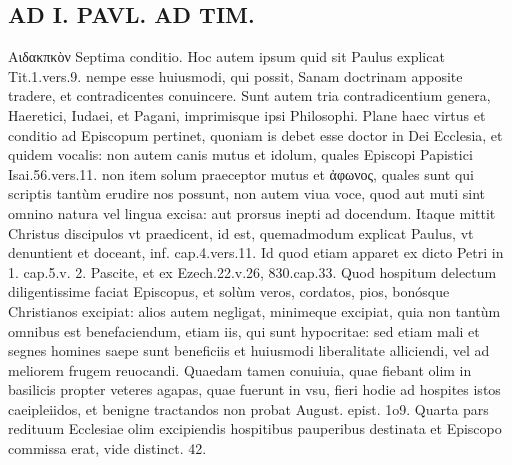\documentclass{article}
\begin{document}
\begin{pages}
\section*{AD I. PAVL. AD TIM. }
\marginpar{[ p.126 ]}\pstart Αιδακπκὸν Septima conditio. Hoc autem ipsum quid sit Paulus explicat Tit.1.vers.9. nempe esse huiusmodi, qui possit, Sanam doctrinam apposite tradere, et contradicentes conuincere. Sunt autem tria contradicentium genera, Haeretici, Iudaei, et Pagani, imprimisque ipsi Philosophi. Plane haec virtus et conditio ad Episcopum pertinet, quoniam is debet esse doctor in Dei Ecclesia, et quidem vocalis: non autem canis mutus et idolum, quales Episcopi Papistici Isai.56.vers.11. non item solum praeceptor mutus et ἀφωνος, quales sunt qui scriptis tantùm erudire nos possunt, non autem viua voce, quod aut muti sint omnino natura vel lingua excisa: aut prorsus inepti ad docendum. Itaque mittit Christus discipulos vt praedicent, id est, quemadmodum explicat Paulus, vt denuntient et doceant, inf. cap.4.vers.11. Id quod etiam apparet ex dicto Petri in 1. cap.5.v. 2. Pascite, et ex Ezech.22.v.26, 830.cap.33. Quod  \pend\pstart hospitum delectum diligentissime faciat Episcopus, et solùm veros, cordatos, pios, bonósque Christianos excipiat: alios autem negligat, minimeque  excipiat, quia non tantùm omnibus est benefaciendum, etiam iis, qui sunt hypocritae: sed etiam mali et segnes homines saepe sunt beneficiis et huiusmodi liberalitate alliciendi, vel ad meliorem frugem reuocandi. Quaedam tamen conuiuia, quae fiebant olim in basilicis propter veteres agapas, quae fuerunt in vsu, fieri hodie ad hospites istos caeipleiidos, et benigne tractandos non probat August. epist. 1o9. Quarta pars redituum Ecclesiae olim excipiendis hospitibus pauperibus destinata et Episcopo commissa erat, vide distinct. 42.  \pend

\end{pages}
\end{document}
